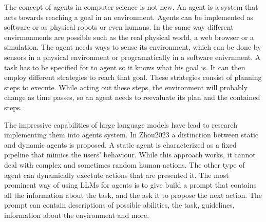 \documentclass[../../main.tex]{subfiles}
\begin{document}
The concept of agents in computer science is not new.
An agent is a system that acts towards reaching a goal in an environment.
Agents can be implemented as software or as physical robots or even humans.
In the same way different envirmonments are possible
such as the real physical world,
a web browser or a simulation.
The agent needs ways to sense its environment,
which can be done by sensors in a physical environment
or programatically in a software enivrnment.
A task has to be specified for to agent so it knows what his goal is.
It can then employ different strategies to reach that goal.
These strategies consist of planning steps to execute.
While acting out these steps,
the environment will probably change as time passes,
so an agent needs to reevaluate its plan and the contained steps.

The impressive capabilities of large language models
have lead to research implementing them into agents system.
In Zhou2023 a distinction between static and dynamic agents is proposed.
A static agent is characterized as a fixed pipeline that mimics the users' behaviour.
While this approach works,
it cannot deal with complex and sometimes random human actions.
The other type of agent can dynamically exectute actions that are presented it.
The most prominent way of using LLMs for agents
is to give build a prompt that contains all the information about the task,
and the ask it to propose the next action.
The prompt can contain descriptions of possible abilities,
the task,
guidelines,
information about the environment and more.
\end{document}
